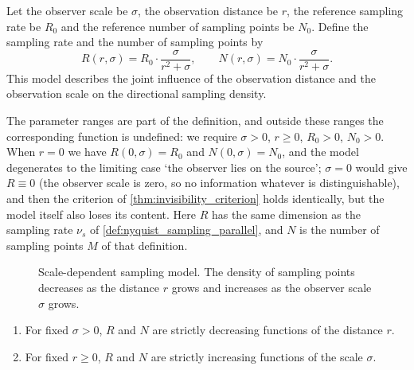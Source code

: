 \begin{definition}\label{def:dynamic_sampling}
Let the observer scale be $\sigma$, the observation distance be $r$, the reference sampling rate be $R_0$ and the reference number of sampling points be $N_0$. Define the sampling rate and the number of sampling points by
\[
R(r, \sigma) = R_0 \cdot \frac{\sigma}{r^2 + \sigma}, \qquad
N(r, \sigma) = N_0 \cdot \frac{\sigma}{r^2 + \sigma}.
\]
This model describes the joint influence of the observation distance and the observation scale on the directional sampling density.

The parameter ranges are part of the definition, and outside these ranges the corresponding function is undefined: we require $\sigma>0$, $r\ge0$, $R_0>0$, $N_0>0$. When $r=0$ we have $R(0,\sigma)=R_0$ and $N(0,\sigma)=N_0$, and the model degenerates to the limiting case `the observer lies on the source'; $\sigma=0$ would give $R\equiv0$ (the observer scale is zero, so no information whatever is distinguishable), and then the criterion of \cref{thm:invisibility_criterion} holds identically, but the model itself also loses its content. Here $R$ has the same dimension as the sampling rate $\nu_s$ of \cref{def:nyquist_sampling_parallel}, and $N$ is the number of sampling points $M$ of that definition.
\end{definition}

\begin{figure}[htbp]
    \centering
    \caption{Scale-dependent sampling model. The density of sampling points decreases as the distance $r$ grows and increases as the observer scale $\sigma$ grows.}
    \label{fig:dynamic_sampling}
\end{figure}

\begin{property}\label{prop:sampling_monotonicity}
\begin{enumerate}[label=(\roman*)]
    \item For fixed $\sigma > 0$, $R$ and $N$ are strictly decreasing functions of the distance $r$.
    \item For fixed $r \ge 0$, $R$ and $N$ are strictly increasing functions of the scale $\sigma$.
\end{enumerate}
\end{property}

